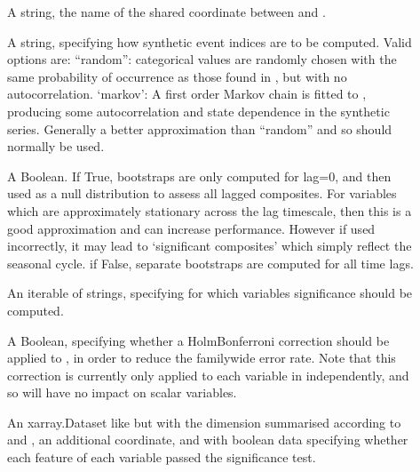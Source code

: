 \documentclass[letterpaper,10pt,english]{sphinxmanual}
\begin{document}
\begin{fulllineitems}
\begin{fulllineitems}
\begin{description}
\end{description}

\sphinxAtStartPar
{}
\begin{description}
\item[{}] \leavevmode
\sphinxAtStartPar
A string, the name of the shared coordinate between  and .

\item[{}] \leavevmode
\sphinxAtStartPar
A string, specifying how synthetic event indices are to be computed. Valid options are:
“random”: categorical values are randomly chosen with the same probability of occurrence as those found in , but with no autocorrelation.
‘markov’: A first order Markov chain is fitted to , producing some autocorrelation and state dependence in the synthetic series. Generally a better approximation than “random” and so should normally be used.

\item[{}] \leavevmode
\sphinxAtStartPar
A Boolean. If True, bootstraps are only computed for lag=0, and then used as a null distribution to assess all lagged composites. For variables which are approximately stationary across the lag timescale, then this is a good approximation and can increase performance. However if used incorrectly, it may lead to ‘significant composites’ which simply reflect the seasonal cycle. if False, separate bootstraps are computed for all time lags.

\item[{}] \leavevmode
\sphinxAtStartPar
An iterable of strings, specifying for which variables significance should be computed.

\item[{}] \leavevmode
\sphinxAtStartPar
A Boolean, specifying whether a Holm\sphinxhyphen{}Bonferroni correction should be applied to , in order to reduce the family\sphinxhyphen{}wide error rate. Note that this correction is currently only applied to each variable in  independently, and so will have no impact on scalar variables.

\item[{}] \leavevmode
\sphinxAtStartPar
An xarray.Dataset like  but with the  dimension summarised according to  and , an additional  coordinate, and with boolean data specifying whether each feature of each variable passed the significance test.


\end{description}
\end{fulllineitems}
\end{fulllineitems}
\end{document}
